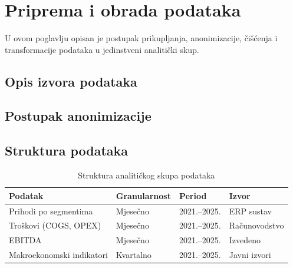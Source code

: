 \documentclass[zavrsnirad]{fer}
\begin{document}
\chapter{Priprema i obrada podataka}
\label{pog:priprema_podataka}

U ovom poglavlju opisan je postupak prikupljanja, anonimizacije, \v{c}i\v{s}\'{c}enja i transformacije podataka u jedinstveni analiti\v{c}ki skup.

\section{Opis izvora podataka}
\label{sec:izvor_podataka}


\section{Postupak anonimizacije}
\label{sec:anonimizacija}


\section{Struktura podataka}
\label{sec:struktura_podataka}


\begin{table}[htb]
  \centering
  \caption{Struktura analiti\v{c}kog skupa podataka}
  \label{tab:struktura_podataka}
  \begin{tabular}{llll}
    \toprule
    \textbf{Podatak} & \textbf{Granularnost} & \textbf{Period} & \textbf{Izvor} \\
    \midrule
    Prihodi po segmentima & Mjese\v{c}no & 2021.--2025. & ERP sustav \\
    Tro\v{s}kovi (COGS, OPEX) & Mjese\v{c}no & 2021.--2025. & Ra\v{c}unovodstvo \\
    EBITDA & Mjese\v{c}no & 2021.--2025. & Izvedeno \\
    Makroekonomski indikatori & Kvartalno & 2021.--2025. & Javni izvori \\
    \bottomrule
  \end{tabular}
\end{table}
\end{document}
